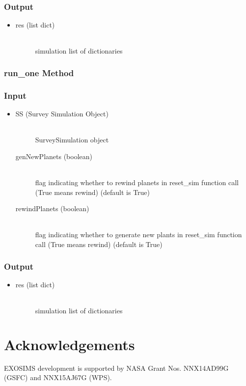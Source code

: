 \documentclass[cleanfoot]{asme2ej}
\begin{document}
\subsubsection*{Output}
\begin{itemize}
\item
\begin{description}
    \item[res (list dict)] \hfill \\ simulation list of dictionaries
\end{description}
\end{itemize}

\subsubsection{run\_one Method} \label{}

\subsubsection*{Input}
\begin{itemize}
\item
\begin{description}
    \item[SS (Survey Simulation Object)] \hfill \\ SurveySimulation object
    \item[genNewPlanets (boolean)] \hfill \\ flag indicating whether to rewind planets in reset\_sim function call (True means rewind) (default is True)
    \item[rewindPlanets (boolean)] \hfill \\ flag indicating whether to generate new plants in reset\_sim function  call (True means rewind) (default is True)
\end{description}
\end{itemize}
\subsubsection*{Output}
\begin{itemize}
\item
\begin{description}
    \item[res (list dict)] \hfill \\ simulation list of dictionaries
\end{description}
\end{itemize}

\section*{Acknowledgements}  EXOSIMS development is supported by NASA Grant Nos. NNX14AD99G (GSFC) and NNX15AJ67G (WPS).
\end{document}
